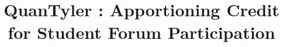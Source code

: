 \documentclass{edm_template}
\begin{document}
\title{QuanTyler : Apportioning Credit for Student Forum Participation}
%
%
%
%
%
\end{document}
